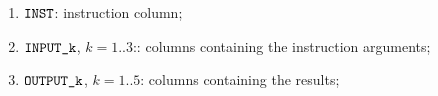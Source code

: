 \begin{enumerate}
\item
	\godGiven{}
	$\texttt{INST}{}$:
	instruction column;
    \item
	\godGiven{}
	$\texttt{INPUT\_k}$, $k=1..3$::
	columns containing the instruction arguments;
    \item
	\markAsJustifiedHere{}
	$\texttt{OUTPUT\_k}$, $k=1..5$:
	columns containing the results;
\end{enumerate}